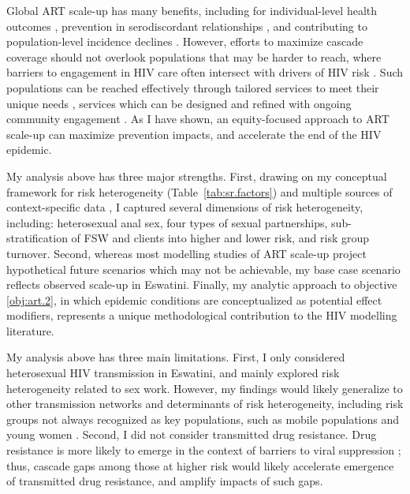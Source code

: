 \par
Global ART scale-up has many benefits, including for
individual-level health outcomes \cite{Gabillard2013,Lundgren2015},
prevention in serodiscordant relationships \cite{Cohen2016},
and contributing to population-level incidence declines \cite{Havlir2020}.
However, efforts to maximize cascade coverage should not overlook
populations that may be harder to reach,
where barriers to engagement in HIV care often intersect with drivers of HIV risk
\cite{Wanyenze2016,Schwartz2017,Schmidt-Sane2022,Baral2019}.
Such populations can be reached effectively through
tailored services to meet their unique needs \cite{Ehrenkranz2019},
services which can be designed and refined with ongoing community engagement
\cite{Chikwari2018,Mlambo2019,Comins2022}.
As I have shown, an equity-focused approach to ART scale-up can maximize prevention impacts,
and accelerate the end of the HIV epidemic.
\par
My analysis above has three major strengths.
First, drawing on my conceptual framework for risk heterogeneity (Table~\ref{tab:sr.factors})
and multiple sources of context-specific data \cite{SDHS2006,SHIMS1,Justman2016,Baral2014,EswKP2014},
I captured several dimensions of risk heterogeneity, including:
heterosexual anal sex,
four types of sexual partnerships,
sub-stratification of FSW and clients into higher and lower risk,
and risk group turnover.
Second, whereas most modelling studies of ART scale-up
project hypothetical future scenarios which may not be achievable,
my base case scenario reflects observed scale-up in Eswatini.
Finally, my analytic approach to objective \ref{obj:art.2},
in which epidemic conditions are conceptualized as potential effect modifiers,
represents a unique methodological contribution to the HIV modelling literature.
\par
My analysis above has three main limitations.
First, I only considered heterosexual HIV transmission in Eswatini,
and mainly explored risk heterogeneity related to sex work.
However, my findings would likely generalize
to other transmission networks and determinants of risk heterogeneity,
including risk groups not always recognized as key populations,
such as mobile populations and young women \cite{Tanser2015,Cheuk2020}.
Second, I did not consider transmitted drug resistance.
Drug resistance is more likely to emerge
in the context of barriers to viral suppression \cite{Pham2014};
thus, cascade gaps among those at higher risk
would likely accelerate emergence of transmitted drug resistance, and amplify impacts of such gaps.
